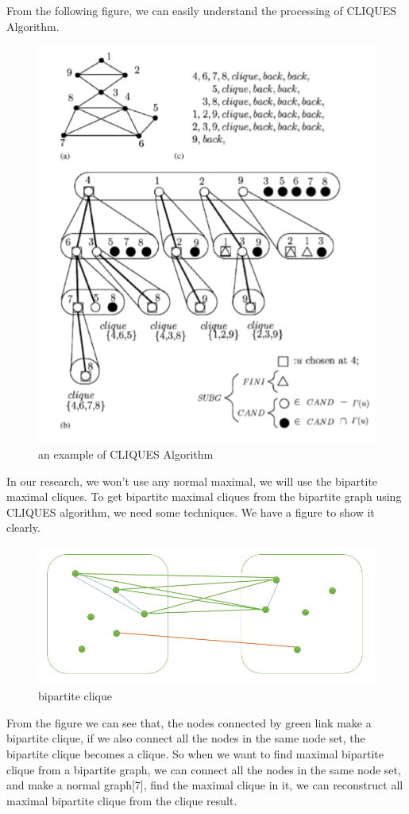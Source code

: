 \newpage
From the following figure, we can easily understand the processing of CLIQUES Algorithm.
\begin{figure}[!hbp]
\centering
\includegraphics[width=400pt]{./pictures/0204.png}
\caption{an example of CLIQUES Algorithm}
\end{figure}
\newpage
In our research, we won't use any normal maximal, we will use the bipartite maximal cliques. To get bipartite maximal cliques from the bipartite graph using CLIQUES algorithm, we need some techniques. We have a figure to show it clearly.
\begin{figure}[!h]
\centering
\includegraphics[width=350pt]{./pictures/0204-1.png}
\caption{bipartite clique}
\end{figure}
From the figure we can see that, the nodes connected by green link make a bipartite clique, if we also connect all the nodes in the same node set, the bipartite clique becomes a clique. So when we want to find maximal bipartite clique from a bipartite graph, we can connect all the nodes in the same node set, and make a normal graph[7], find the maximal clique in it, we can reconstruct all maximal bipartite clique from the clique result.